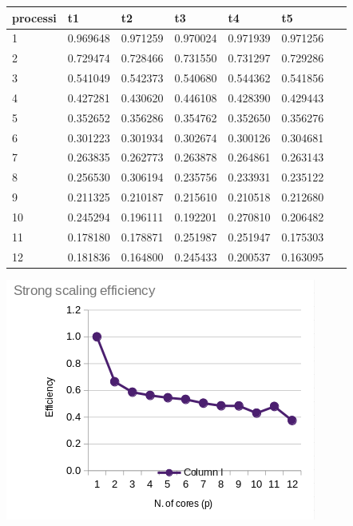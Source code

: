 \documentclass[a4paper,12pt, twoside]{report}
\begin{document}
\begin{table}[!ht]
    \centering
    \begin{tabular}{|l|l|l|l|l|l|l|}
    \hline
        processi & t1 & t2 & t3 & t4 & t5 & ~ \\ \hline
        1 & 0.969648 & 0.971259 & 0.970024 & 0.971939 & 0.971256 & ~ \\ \hline
        2 & 0.729474 & 0.728466 & 0.731550 & 0.731297 & 0.729286 & ~ \\ \hline
        3 & 0.541049 & 0.542373 & 0.540680 & 0.544362 & 0.541856 & ~ \\ \hline
        4 & 0.427281 & 0.430620 & 0.446108 & 0.428390 & 0.429443 & ~ \\ \hline
        5 & 0.352652 & 0.356286 & 0.354762 & 0.352650 & 0.356276 & ~ \\ \hline
        6 & 0.301223 & 0.301934 & 0.302674 & 0.300126 & 0.304681 & ~ \\ \hline
        7 & 0.263835 & 0.262773 & 0.263878 & 0.264861 & 0.263143 & ~ \\ \hline
        8 & 0.256530 & 0.306194 & 0.235756 & 0.233931 & 0.235122 & ~ \\ \hline
        9 & 0.211325 & 0.210187 & 0.215610 & 0.210518 & 0.212680 & ~ \\ \hline
        10 & 0.245294 & 0.196111 & 0.192201 & 0.270810 & 0.206482 & ~ \\ \hline
        11 & 0.178180 & 0.178871 & 0.251987 & 0.251947 & 0.175303 & ~ \\ \hline
        12 & 0.181836 & 0.164800 & 0.245433 & 0.200537 & 0.163095 & ~ \\ \hline
    \end{tabular}
\newline
\end{table}
\includegraphics[scale=0.5]{images/mpi_strong.png}
\end{document}
